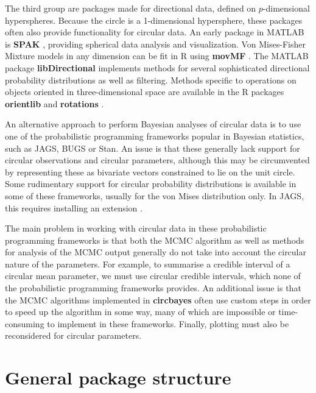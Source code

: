 \documentclass{article}
\let\proglang=\textsf
\newcommand{\pkg}[1]{\textbf{#1}}
\begin{document}
The third group are packages made for directional data, defined on
\(p\)-dimensional hyperspheres. Because the circle is a 1-dimensional
hypersphere, these packages often also provide functionality for
circular data. An early package in \proglang{MATLAB} is \pkg{SPAK}
\citep{leong1998methods}, providing spherical data analysis and
visualization. Von Mises-Fisher Mixture models in any dimension can be
fit in \proglang{R} using \pkg{movMF} \citep{hornik2014movmf}. The
\proglang{MATLAB} package \pkg{libDirectional}
\citep{kurz2017directional} implements methods for several sophisticated
directional probability distributions as well as filtering. Methods
specific to operations on objects oriented in three-dimensional space
are available in the \proglang{R} packages \pkg{orientlib}
\citep{murdoch2003orientlib} and \pkg{rotations}
\citep{stanfill2014rotations}.

An alternative approach to perform Bayesian analyses of circular data is
to use one of the probabilistic programming frameworks popular in
Bayesian statistics, such as \proglang{JAGS}, \proglang{BUGS} or
\proglang{Stan}. An issue is that these generally lack support for
circular observations and circular parameters, although this may be
circumvented by representing these as bivariate vectors constrained to
lie on the unit circle. Some rudimentary support for circular
probability distributions is available in some of these frameworks,
usually for the von Mises distribution only. In \proglang{JAGS}, this
requires installing an extension \citep{jagsvonmises}.

The main problem in working with circular data in these probabilistic
programming frameworks is that both the MCMC algorithm as well as
methods for analysis of the MCMC output generally do not take into
account the circular nature of the parameters. For example, to summarise
a credible interval of a circular mean parameter, we must use circular
credible intervals, which none of the probabilistic programming
frameworks provides. An additional issue is that the MCMC algorithms
implemented in \pkg{circbayes} often use custom steps in order to speed
up the algorithm in some way, many of which are impossible or
time-consuming to implement in these frameworks. Finally, plotting must
also be reconsidered for circular parameters.

\hypertarget{general-package-structure}{%
	\section{General package structure}\label{general-package-structure}}
\end{document}
